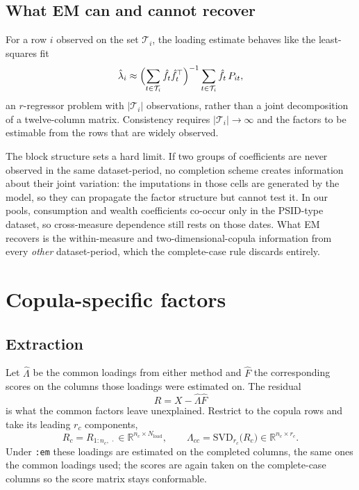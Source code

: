 \documentclass[11pt]{article}
\newcommand{\code}[1]{\texttt{#1}}
\newcommand{\SVD}{\mathrm{SVD}}
\begin{document}
\subsection{What EM can and cannot recover}

For a row $i$ observed on the set $\mathcal{T}_i$, the loading estimate behaves
like the least-squares fit
\begin{equation}
  \hat\lambda_i \approx \Bigl( \sum_{t\in\mathcal{T}_i} \hat f_t \hat f_t^{\top} \Bigr)^{-1}
                        \sum_{t\in\mathcal{T}_i} \hat f_t\, P_{it},
\end{equation}
an $r$-regressor problem with $|\mathcal{T}_i|$ observations, rather than a
joint decomposition of a twelve-column matrix. Consistency requires
$|\mathcal{T}_i| \to \infty$ and the factors to be estimable from the rows that
are widely observed.

The block structure sets a hard limit. If two groups of coefficients are never
observed in the same dataset-period, no completion scheme creates information
about their joint variation: the imputations in those cells are generated by
the model, so they can propagate the factor structure but cannot test it. In our
pools, consumption and wealth coefficients co-occur only in the
PSID-type dataset, so cross-measure dependence still rests on those dates. What
EM recovers is the within-measure and two-dimensional-copula information from
every \emph{other} dataset-period, which the complete-case rule discards
entirely.

\section{Copula-specific factors}

\subsection{Extraction}

Let $\hat\Lambda$ be the common loadings from either method and $\hat F$ the
corresponding scores on the columns those loadings were estimated on. The
residual
\begin{equation}
  R = X - \hat\Lambda \hat F
\end{equation}
is what the common factors leave unexplained. Restrict to the copula rows and
take its leading $r_c$ components,
\begin{equation}
  R_c = R_{1:n_c,\,\cdot} \in \mathbb{R}^{n_c \times N_{\mathrm{load}}},
  \qquad
  \Lambda_{cc} = \SVD_{r_c}\bigl( R_c \bigr) \in \mathbb{R}^{n_c \times r_c} .
\end{equation}
Under \code{:em} these loadings are estimated on the completed columns, the same
ones the common loadings used; the scores are again taken on the complete-case
columns so the score matrix stays conformable.
\end{document}
